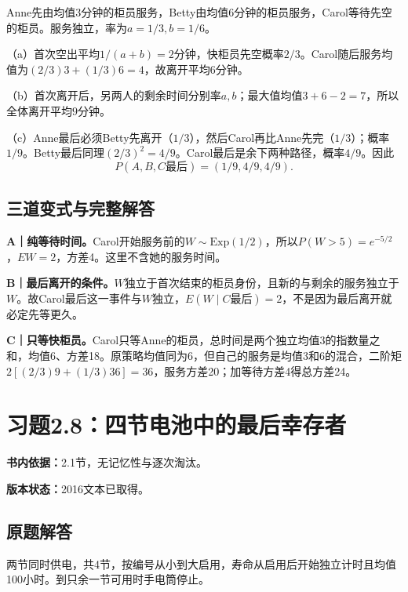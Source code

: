 \documentclass[
  11pt,
  a4paper,
  UTF8,fontset=fandol]{ctexart}
\let\OldSection\section
\renewcommand{\section}{\Needspace{7\baselineskip}\OldSection}
\let\OldSubsection\subsection
\renewcommand{\subsection}{\Needspace{5\baselineskip}\OldSubsection}
\begin{document}
Anne先由均值3分钟的柜员服务，Betty由均值6分钟的柜员服务，Carol等待先空的柜员。服务独立，率为\(a=1/3,b=1/6\)。

（a）首次空出平均\(1/(a+b)=2\)分钟，快柜员先空概率\(2/3\)。Carol随后服务均值为\((2/3)3+(1/3)6=4\)，故离开平均\(\boxed6\)分钟。

（b）首次离开后，另两人的剩余时间分别率\(a,b\)；最大值均值\(3+6-2=7\)，所以全体离开平均\(\boxed9\)分钟。

（c）Anne最后必须Betty先离开（\(1/3\)），然后Carol再比Anne先完（\(1/3\)）；概率\(1/9\)。Betty最后同理\((2/3)^2=4/9\)。Carol最后是余下两种路径，概率\(4/9\)。因此
\[\boxed{P(A,B,C\text{最后})=(1/9,4/9,4/9).}\]

\subsection{三道变式与完整解答}\label{ux4e09ux9053ux53d8ux5f0fux4e0eux5b8cux6574ux89e3ux7b54-6}

\textbf{A｜纯等待时间。}Carol开始服务前的\(W\sim\mathrm{Exp}(1/2)\)，所以\(P(W>5)=e^{-5/2}\)，\(EW=2\)，方差4。这里不含她的服务时间。

\textbf{B｜最后离开的条件。}\(W\)独立于首次结束的柜员身份，且新的与剩余的服务独立于\(W\)。故Carol最后这一事件与\(W\)独立，\(E(W\mid C\text{最后})=2\)，不是因为最后离开就必定先等更久。

\textbf{C｜只等快柜员。}Carol只等Anne的柜员，总时间是两个独立均值3的指数量之和，均值6、方差18。原策略均值同为6，但自己的服务是均值3和6的混合，二阶矩\(2[(2/3)9+(1/3)36]=36\)，服务方差20；加等待方差4得总方差24。

\newpage

\section{习题2.8：四节电池中的最后幸存者}\label{ux4e60ux98982.8ux56dbux8282ux7535ux6c60ux4e2dux7684ux6700ux540eux5e78ux5b58ux8005}

\textbf{书内依据：}2.1节，无记忆性与逐次淘汰。

\textbf{版本状态：}2016文本已取得。

\subsection{原题解答}\label{ux539fux9898ux89e3ux7b54-7}

两节同时供电，共4节，按编号从小到大启用，寿命从启用后开始独立计时且均值100小时。到只余一节可用时手电筒停止。
\end{document}
